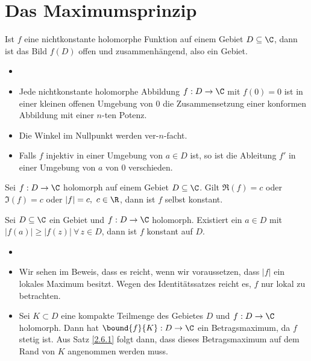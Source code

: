 \section{Das Maximumsprinzip}	\lecture
		
		\begin{thmn}\label{2.6.1}
			Ist $f$ eine nichtkonstante holomorphe Funktion auf einem Gebiet $D \subseteq \C$, dann ist das Bild $f(D)$ offen und zusammenhängend, also ein Gebiet.
		\end{thmn}
		
		\begin{prop}
			\begin{itemize}
				\item[]
				\item Jede nichtkonstante holomorphe Abbildung $f: D \to \C$ mit $f(0) = 0$ ist in einer kleinen offenen Umgebung von $0$ die Zusammensetzung einer konformen Abbildung mit einer $n$-ten Potenz.
				\item Die Winkel im Nullpunkt werden ver-$n$-facht.
				\item Falls $f$ injektiv in einer Umgebung von $a \in D$ ist, so ist die Ableitung $f'$ in einer Umgebung von $a$ von $0$ verschieden.
			\end{itemize}
		\end{prop}
		
		\begin{cor}
			Sei $ f: D \to \C $ holomorph auf einem Gebiet $D \subseteq \C$. Gilt $ \Re(f)=c $ oder $ \Im(f) = c $ oder $ |f|=c,\ c \in \R $, dann ist $f$ selbst konstant.
		\end{cor}
		
		\begin{thmn}
			Sei $ D \subseteq \C $ ein Gebiet und $ f: D \to \C $ holomorph. Existiert ein $a \in D$ mit $ |f(a)| \geq |f(z)| \ \forall\, z \in D $, dann ist $f$ konstant auf $D$.
		\end{thmn}
		
		\begin{rem}
			\begin{itemize}
				\item[]
				\item Wir sehen im Beweis, dass es reicht, wenn wir voraussetzen, dass $|f|$ ein lokales Maximum besitzt. Wegen des Identitätssatzes reicht es, $f$ nur lokal zu betrachten.
				\item Sei $ K \subset D $ eine kompakte Teilmenge des Gebietes $D$ und $f : D \to \C$ holomorph. Dann hat $ \bound{f}{K}: D \to \C $ ein Betragsmaximum, da $f$ stetig ist. Aus Satz \ref{2.6.1} folgt dann, dass dieses Betragsmaximum auf dem Rand von $K$ angenommen werden muss.
			\end{itemize}
		\end{rem}
		
